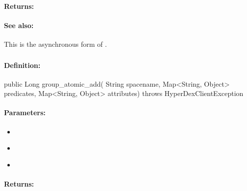 \paragraph{Returns:}


\paragraph{See also:}  This is the asynchronous form of .

\pagebreak
\subsubsection{}
\label{api:java:group_atomic_add}


\paragraph{Definition:}
\begin{javacode}
public Long group_atomic_add(
        String spacename,
        Map<String, Object> predicates,
        Map<String, Object> attributes) throws HyperDexClientException
\end{javacode}

\paragraph{Parameters:}
\begin{itemize}[noitemsep]
\item {}\\

\item {}\\

\item {}\\

\end{itemize}

\paragraph{Returns:}


